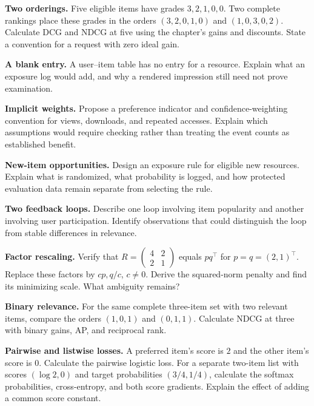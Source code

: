 \begin{exercises}
\item \textbf{Two orderings.} Five eligible items have grades $3,2,1,0,0$. Two complete rankings place these grades in the orders $(3,2,0,1,0)$ and $(1,0,3,0,2)$. Calculate DCG and NDCG at five using the chapter's gains and discounts. State a convention for a request with zero ideal gain.
\item \textbf{A blank entry.} A user--item table has no entry for a resource. Explain what an exposure log would add, and why a rendered impression still need not prove examination.
\item \textbf{Implicit weights.} Propose a preference indicator and confidence-weighting convention for views, downloads, and repeated accesses. Explain which assumptions would require checking rather than treating the event counts as established benefit.
\item \textbf{New-item opportunities.} Design an exposure rule for eligible new resources. Explain what is randomized, what probability is logged, and how protected evaluation data remain separate from selecting the rule.
\item \textbf{Two feedback loops.} Describe one loop involving item popularity and another involving user participation. Identify observations that could distinguish the loop from stable differences in relevance.
\item \textbf{Factor rescaling.} Verify that $R=\left(\begin{smallmatrix}4&2\\2&1\end{smallmatrix}\right)$ equals $p q^\top$ for $p=q=(2,1)^\top$. Replace these factors by $cp,q/c$, $c\ne0$. Derive the squared-norm penalty and find its minimizing scale. What ambiguity remains?
\item \textbf{Binary relevance.} For the same complete three-item set with two relevant items, compare the orders $(1,0,1)$ and $(0,1,1)$. Calculate NDCG at three with binary gains, AP, and reciprocal rank.
\item \textbf{Pairwise and listwise losses.} A preferred item's score is $2$ and the other item's score is $0$. Calculate the pairwise logistic loss. For a separate two-item list with scores $(\log2,0)$ and target probabilities $(3/4,1/4)$, calculate the softmax probabilities, cross-entropy, and both score gradients. Explain the effect of adding a common score constant.

\end{exercises}
